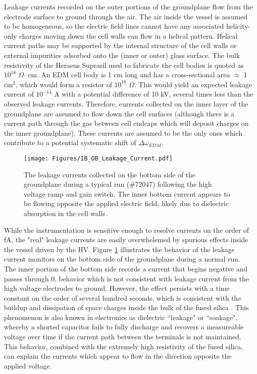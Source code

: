 \documentclass [10pt, twoside] {uwthesis}[2012/04/02]
\begin{document}
Leakage currents recorded on the outer portions of the groundplane flow from the electrode surface to ground through the air. The air inside the vessel is assumed to be homogeneous, so the electric field lines cannot have any associated helicity-only charges moving down the cell walls can flow in a helical pattern. Helical current paths may be supported by the internal structure of the cell walls or external impurities adsorbed onto the (inner or outer) glass surface. The bulk resistivity of the Heraeus Suprasil used to fabricate the cell bodies is quoted as $10^{18}$ $\Omega \cdot$cm. An EDM cell body is 1 cm long and has a cross-sectional area $\approx$ 1 cm$^2$, which would form a resistor of $10^{18}$ $\Omega$. This would yield an expected leakage current of $10^{-14}$ A with a potential difference of 10 kV, several times less than the observed leakage currents. Therefore, currents collected on the inner layer of the groundplane are assumed to flow down the cell surfaces (although there is a current path through the gas between cell endcaps which will deposit charges on the inner groundplane). These currents are assumed to be the only ones which contribute to a potential systematic shift of $\Delta\omega_{EDM}$. 

\begin{figure}
\begin{center}
\texttt{[image: Figures/IB\_OB\_Leakage\_Current.pdf]}
\end{center}
\caption[Bottom Side Leakage Currents]
{\narrower The leakage currents collected on the bottom side of the groundplane during a typical run (\#72047) following the high voltage ramp and gain switch. The inner bottom current appears to be flowing opposite the applied electric field, likely due to dielectric absorption in the cell walls.}
\label{IB_OB_Leakage_Current}
\end{figure}

While the instrumentation is sensitive enough to resolve currents on the order of fA, the "real" leakage currents are easily overwhelemed by spurious effects inside the vessel driven by the HV. Figure \ref{IB_OB_Leakage_Current} illustrates the behavior of the leakage current monitors on the bottom side of the groundplane during a normal run. The inner portion of the bottom side records a current that begins negative and passes through 0, behavior which is not consistent with leakage current from the high voltage electrodes to ground. However, the effect persists with a time constant on the order of several hundred seconds, which is consistent with the buildup and dissipation of space charges inside the bulk of the fused silica \cite{2010_LIGO_Fused_Silica_Space_Charge}. This phenomenon is also known in electronics as dielectric ``leakage" or ``soakage", whereby a shorted capacitor fails to fully discharge and recovers a measureable voltage over time if the current path between the terminals is not maintained. This behavior, combined with the extremely high resistivity of the fused silica, can explain the currents which appear to flow in the direction opposite the applied voltage.
\end{document}
